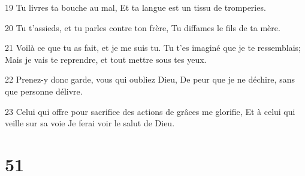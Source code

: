 \par 19 Tu livres ta bouche au mal, Et ta langue est un tissu de tromperies.
\par 20 Tu t'assieds, et tu parles contre ton frère, Tu diffames le fils de ta mère.
\par 21 Voilà ce que tu as fait, et je me suis tu. Tu t'es imaginé que je te ressemblais; Mais je vais te reprendre, et tout mettre sous tes yeux.
\par 22 Prenez-y donc garde, vous qui oubliez Dieu, De peur que je ne déchire, sans que personne délivre.
\par 23 Celui qui offre pour sacrifice des actions de grâces me glorifie, Et à celui qui veille sur sa voie Je ferai voir le salut de Dieu.

\chapter{51}

